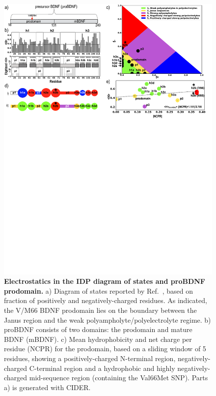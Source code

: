 \documentclass[10pt,letterpaper]{article}
\begin{document}
\begin{figure}[!ht]
 \includegraphics[scale=0.5,width=\textwidth,trim={0 0cm 0 0cm},clip]{../figures/fig1.pdf}
\caption{{\bf Electrostatics in the IDP diagram of states and proBDNF prodomain.} 
a) Diagram of states reported by Ref.~\cite {Das2015,Das2013a}, based on fraction of positively and negatively-charged residues.  As indicated, the V/M66 BDNF prodomain lies on the boundary between the Janus region and the weak polyampholyte/polyelectrolyte regime. b) proBDNF consists of two domains: the prodomain and mature BDNF (mBDNF). %
c) Mean hydrophobicity and net charge per residue (NCPR) for the prodomain, based on a sliding window of 5 residues, showing a positively-charged N-terminal region, negatively-charged C-terminal region and a hydrophobic and highly negatively-charged mid-sequence region (containing the Val66Met SNP). Parts a) is generated with CIDER. ~\cite {Holehouse2017} }
\label{fig1} 
\end{figure}
\end{document}
